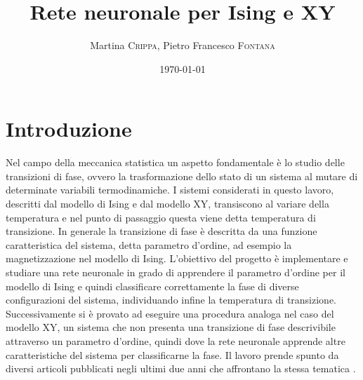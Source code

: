 \documentclass{article}
\title{Rete neuronale per Ising e XY} %
\author{Martina \textsc{Crippa}, Pietro Francesco \textsc{Fontana}} %
\date{\today} %
\begin{document}
\maketitle %




\section{Introduzione}
Nel campo della meccanica statistica un aspetto fondamentale è lo studio delle transizioni di fase, ovvero la trasformazione dello stato di un sistema al mutare di determinate variabili termodinamiche.
I sistemi considerati in questo lavoro, descritti dal modello di Ising e dal modello XY, transiscono al variare della temperatura e nel punto di passaggio questa viene detta temperatura di transizione.
In generale la transizione di fase è descritta da una funzione caratteristica del sistema, detta parametro d'ordine, ad esempio la magnetizzazione nel modello di Ising.
L'obiettivo del progetto è implementare e studiare una rete neuronale in grado di apprendere il parametro d'ordine per il modello di Ising e quindi classificare correttamente la fase di diverse configurazioni del sistema, individuando infine la temperatura di transizione.
Successivamente si è provato ad eseguire una procedura analoga nel caso del modello XY, un sistema che non presenta una transizione di fase descrivibile attraverso un parametro d'ordine, quindi dove la rete neuronale apprende altre caratteristiche del sistema per classificarne la fase.
Il lavoro prende spunto da diversi articoli pubblicati negli ultimi due anni che affrontano la stessa tematica \cite{carrasqu,melko,wessel}.
\end{document}
